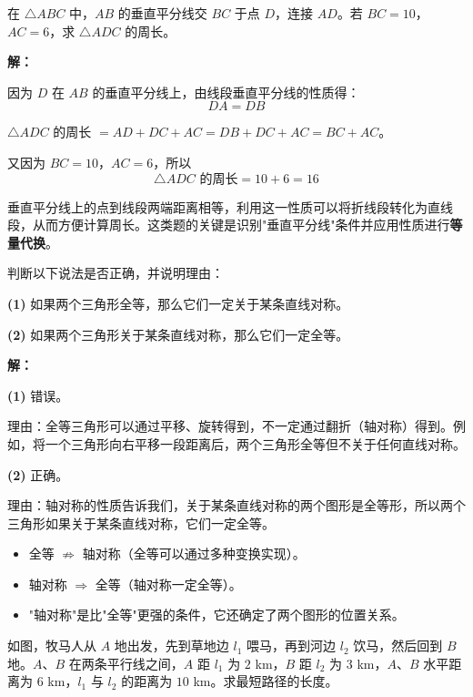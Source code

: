 \documentclass[12pt, a4paper]{ctexart}
\begin{document}
\begin{examplebox}[【例题4】垂直平分线性质的综合应用]
在 $\triangle ABC$ 中，$AB$ 的垂直平分线交 $BC$ 于点 $D$，连接 $AD$。若 $BC = 10$，$AC = 6$，求 $\triangle ADC$ 的周长。
\end{examplebox}

\textbf{解：}

因为 $D$ 在 $AB$ 的垂直平分线上，由线段垂直平分线的性质得：
$$DA = DB$$

$\triangle ADC$ 的周长 $= AD + DC + AC = DB + DC + AC = BC + AC$。

又因为 $BC = 10$，$AC = 6$，所以
$$\triangle ADC \text{ 的周长} = 10 + 6 = 16$$

\begin{tipbox}[方法总结]
垂直平分线上的点到线段两端距离相等，利用这一性质可以将折线段转化为直线段，从而方便计算周长。这类题的关键是识别"垂直平分线"条件并应用性质进行\textbf{等量代换}。
\end{tipbox}

\begin{examplebox}
判断以下说法是否正确，并说明理由：

\textbf{(1)} 如果两个三角形全等，那么它们一定关于某条直线对称。

\textbf{(2)} 如果两个三角形关于某条直线对称，那么它们一定全等。
\end{examplebox}

\textbf{解：}

\textbf{(1)} 错误。

理由：全等三角形可以通过平移、旋转得到，不一定通过翻折（轴对称）得到。例如，将一个三角形向右平移一段距离后，两个三角形全等但不关于任何直线对称。

\textbf{(2)} 正确。

理由：轴对称的性质告诉我们，关于某条直线对称的两个图形是全等形，所以两个三角形如果关于某条直线对称，它们一定全等。

\begin{warnbox}[易错提醒]
\begin{itemize}[nosep]
  \item 全等 $\not\Rightarrow$ 轴对称（全等可以通过多种变换实现）。
  \item 轴对称 $\Rightarrow$ 全等（轴对称一定全等）。
  \item "轴对称"是比"全等"更强的条件，它还确定了两个图形的位置关系。
\end{itemize}
\end{warnbox}

\begin{examplebox}
如图，牧马人从 $A$ 地出发，先到草地边 $l_1$ 喂马，再到河边 $l_2$ 饮马，然后回到 $B$ 地。$A$、$B$ 在两条平行线之间，$A$ 距 $l_1$ 为 $2$ km，$B$ 距 $l_2$ 为 $3$ km，$A$、$B$ 水平距离为 $6$ km，$l_1$ 与 $l_2$ 的距离为 $10$ km。求最短路径的长度。
\end{examplebox}
\end{document}
